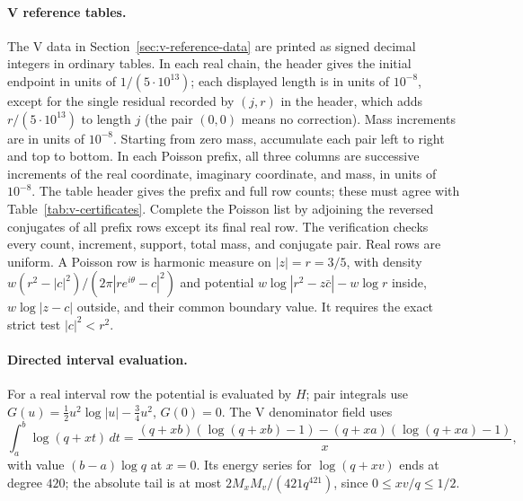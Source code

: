 \paragraph{\textbf{V reference tables.}}
The V data in Section~\ref{sec:v-reference-data} are printed as signed decimal
integers in ordinary tables. In each real chain, the header gives the initial
endpoint in units of $1/(5\cdot10^{13})$; each displayed length is in units of
$10^{-8}$, except for the single residual recorded by $(j,r)$ in the header,
which adds $r/(5\cdot10^{13})$ to length $j$ (the pair $(0,0)$ means no
correction). Mass increments are in units of $10^{-8}$. Starting from zero
mass, accumulate each pair left to right and top to bottom. In each Poisson
prefix, all three columns are successive
increments of the real coordinate, imaginary coordinate, and mass, in units
of $10^{-8}$. The table header gives the prefix and full row counts; these must
agree with Table~\ref{tab:v-certificates}. Complete the Poisson list by adjoining the
reversed conjugates of all prefix rows except its final real row. The verification
checks every count, increment, support, total mass, and conjugate pair. Real
rows are uniform. A Poisson row
is harmonic measure on $|z|=r=3/5$, with density
$w(r^2-|c|^2)/(2\pi|re^{i\theta}-c|^2)$ and potential
$w\log|r^2-z\bar c|-w\log r$ inside, $w\log|z-c|$ outside, and their common
boundary value. It requires the exact strict test $|c|^2<r^2$.

\paragraph{\textbf{Directed interval evaluation.}}
For a real interval row the potential is evaluated by $H$; pair integrals use
$G(u)=\frac12u^2\log|u|-\frac34u^2$, $G(0)=0$. The V denominator field uses
\[
 \int_a^b\log(q+xt)\,dt=
 \frac{(q+xb)(\log(q+xb)-1)-(q+xa)(\log(q+xa)-1)}x,
\]
with value $(b-a)\log q$ at $x=0$. Its energy series for $\log(q+xv)$ ends
at degree $420$; the absolute tail is at most
$2M_xM_v/(421q^{421})$, since $0\le xv/q\le1/2$.

